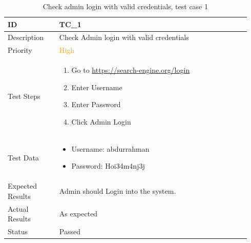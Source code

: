 \documentclass{scrartcl}
\begin{document}
\begin{table}[H]
  \caption{Check admin login with valid credentials, test case 1}
  \begin{tabular}{p{0.2\linewidth} | p{0.74\linewidth}}
    \toprule
    ID & TC\_1
    \\\midrule
    Description & Check Admin login with valid credentials
    \\\hline
    Priority & \textcolor{orange}{High}
    \\\hline
    Test Steps & {
                 \begin{enumerate}
                 \item Go to \url{https://search-engine.org/login}
                 \item Enter Username
                 \item Enter Password
                 \item Click Admin Login
                 \end{enumerate}
                 }\vspace*{-\baselineskip}
    \\\hline
    Test Data & {
                \begin{itemize}
                \item Username: abdurrahman
                \item Password: Hoi34m4nj3j
                \end{itemize}
                }\vspace*{-\baselineskip}
    \\\hline
    Expected Results & Admin should Login into the system.
    \\\hline
    Actual Results & As expected
    \\\hline
    Status & Passed
    \\\bottomrule
  \end{tabular}
\end{table}
\end{document}
